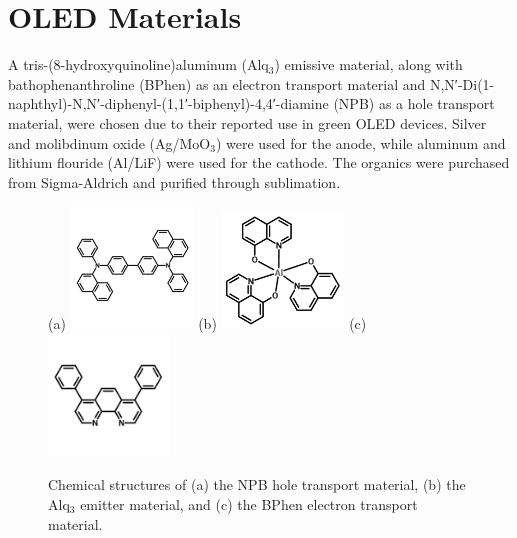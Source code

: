 \documentclass{report}
\begin{document}
    \section{OLED Materials} \label{materials}
    A tris-(8-hydroxyquinoline)aluminum (Alq$_3$) emissive material, along with bathophenanthroline (BPhen) as an electron transport material and N,N′-Di(1-naphthyl)-N,N′-diphenyl-(1,1′-biphenyl)-4,4′-diamine (NPB) as a hole transport material, were chosen due to their reported use in green OLED devices.\cite{Cai2011,Matsushima2008} Silver and molibdinum oxide (Ag/MoO$_3$) were used for the anode, while aluminum and lithium flouride (Al/LiF) were used for the cathode. The organics were purchased from Sigma-Aldrich and purified through sublimation.\\
    \begin{figure}[h!]
        \centering
        (a)
        \includegraphics[width=0.29\textwidth]{images/npb_structure.jpg}
        (b)
        \includegraphics[width=0.29\textwidth]{images/alq3_structure.png}
        (c)
        \includegraphics[width=0.29\textwidth]{images/bphen_structure.jpg}
        \caption{Chemical structures of (a) the NPB hole transport material, (b) the Alq$_3$ emitter material, and (c) the BPhen electron transport material.}
        \label{fig:structures}
    \end{figure}
    \newpage
\end{document}
